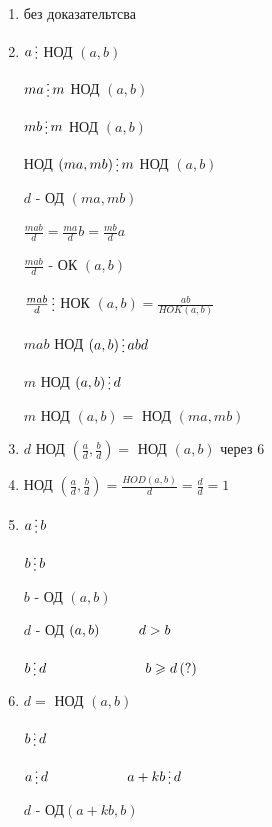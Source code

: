 \documentclass[12pt]{article}
\begin{document}
\begin{enumerate}
    \item без доказательтсва\par
    \item $a \mathop{\raisebox{-2pt}{\vdots}}$ НОД $(a,b)$\par
          $ma \mathop{\raisebox{-2pt}{\vdots}} m$ НОД $(a,b)$\par
          $mb \mathop{\raisebox{-2pt}{\vdots}} m$ НОД $ (a,b)$\par
          НОД $(ma, mb) \mathop{\raisebox{-2pt}{\vdots}} m$ НОД $(a,b)$\par
          $d$ - ОД $(ma,mb)$\par
          $\frac{mab}{d} = \frac{ma}{d}b = \frac{mb}{d}a$\par
          $\frac{mab}{d}$ - ОК $(a,b)$\par
          $\frac{mab}{d} \mathop{\raisebox{-2pt}{\vdots}}$ НОК $(a,b) = \frac{ab}{HOK(a,b)}$\par
          $mab$ НОД $(a,b) \mathop{\raisebox{-2pt}{\vdots}} abd$\par
          $m$ НОД $(a,b) \mathop{\raisebox{-2pt}{\vdots}} d$\par
          $m$ НОД $(a,b) =$ НОД $(ma,mb)$\par
    \item $d$ НОД $(\frac{a}{d}, \frac{b}{d}) =$ НОД $(a,b)$ через 6\par
    \item НОД $(\frac{a}{d}, \frac{b}{d}) = \frac{HOD(a,b)}{d} = \frac{d}{d} = 1$\par
    \item $a \mathop{\raisebox{-2pt}{\vdots}} b$\par
          $b \mathop{\raisebox{-2pt}{\vdots}} b$\par
          $b$ - ОД $(a,b)$\par
          $d$ - ОД $(a,b) \hspace{1 cm} d > b$\par
          $b \mathop{\raisebox{-2pt}{\vdots}} d \hspace{2.5 cm} b \geqslant d \, (?)$\par
    \item $d =$ НОД $(a,b)$\par
          $b \mathop{\raisebox{-2pt}{\vdots}} d$\par
          $a \mathop{\raisebox{-2pt}{\vdots}} d \hspace{2 cm} a + kb \mathop{\raisebox{-2pt}{\vdots}} d$\par
          $d$ - ОД$(a+kb, b)$\par

\end{enumerate}
\end{document}
